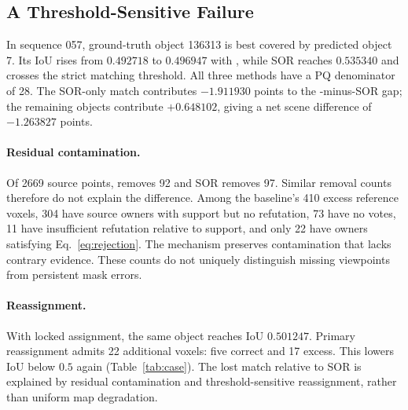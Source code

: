 \subsection{A Threshold-Sensitive Failure}
\label{sec:failure}
In sequence 057, ground-truth object 136313 is best covered by predicted object 7. Its IoU rises from $0.492718$ to $0.496947$ with \ours{}, while SOR reaches $0.535340$ and crosses the strict matching threshold. All three methods have a PQ denominator of 28. The SOR-only match contributes $-1.911930$ points to the \ours{}-minus-SOR gap; the remaining objects contribute $+0.648102$, giving a net scene difference of $-1.263827$ points.

\begin{table}[t]
\centering
\caption{Reference-domain support for the threshold-sensitive object (GT 136313, predicted ID 7). Counts are reference voxels, not raw source points.}
\label{tab:case}
\begingroup\setlength{\tabcolsep}{5pt}

\endgroup
\end{table}

\paragraph{Residual contamination.} Of 2669 source points, \ours{} removes 92 and SOR removes 97. Similar removal counts therefore do not explain the difference. Among the baseline's 410 excess reference voxels, 304 have source owners with support but no refutation, 73 have no votes, 11 have insufficient refutation relative to support, and only 22 have owners satisfying Eq.~\eqref{eq:rejection}. The mechanism preserves contamination that lacks contrary evidence. These counts do not uniquely distinguish missing viewpoints from persistent mask errors.

\paragraph{Reassignment.} With locked assignment, the same \ours{} object reaches IoU $0.501247$. Primary reassignment admits 22 additional voxels: five correct and 17 excess. This lowers IoU below $0.5$ again (Table~\ref{tab:case}). The lost match relative to SOR is explained by residual contamination and threshold-sensitive reassignment, rather than uniform map degradation.

